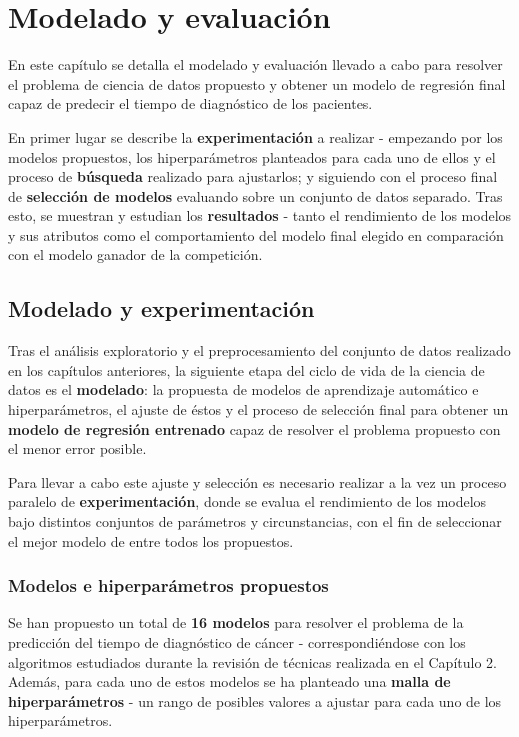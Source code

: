 \chapter{Modelado y evaluación}

En este capítulo se detalla el modelado y evaluación llevado a cabo para resolver el problema de ciencia de datos propuesto y obtener un modelo de regresión final capaz de predecir el tiempo de diagnóstico de los pacientes.

En primer lugar se describe la \textbf{experimentación} a realizar - empezando por los modelos propuestos, los hiperparámetros planteados para cada uno de ellos y el proceso de \textbf{búsqueda} realizado para ajustarlos; y siguiendo con el proceso final de \textbf{selección de modelos} evaluando sobre un conjunto de datos separado. Tras esto, se muestran y estudian los \textbf{resultados} - tanto el rendimiento de los modelos y sus atributos como el comportamiento del modelo final elegido en comparación con el modelo ganador de la competición.

\section{Modelado y experimentación}

Tras el análisis exploratorio y el preprocesamiento del conjunto de datos realizado en los capítulos anteriores, la siguiente etapa del ciclo de vida de la ciencia de datos es el \textbf{modelado}: la propuesta de modelos de aprendizaje automático e hiperparámetros, el ajuste de éstos y el proceso de selección final para obtener un \textbf{modelo de regresión entrenado} capaz de resolver el problema propuesto con el menor error posible.

Para llevar a cabo este ajuste y selección es necesario realizar a la vez un proceso paralelo de \textbf{experimentación}, donde se evalua el rendimiento de los modelos bajo distintos conjuntos de parámetros y circunstancias, con el fin de seleccionar el mejor modelo de entre todos los propuestos.

\subsection{Modelos e hiperparámetros propuestos}

Se han propuesto un total de \textbf{16 modelos} para resolver el problema de la predicción del tiempo de diagnóstico de cáncer - correspondiéndose con los algoritmos estudiados durante la revisión de técnicas realizada en el Capítulo 2. Además, para cada uno de estos modelos se ha planteado una \textbf{malla de hiperparámetros} - un rango de posibles valores a ajustar para cada uno de los hiperparámetros.

